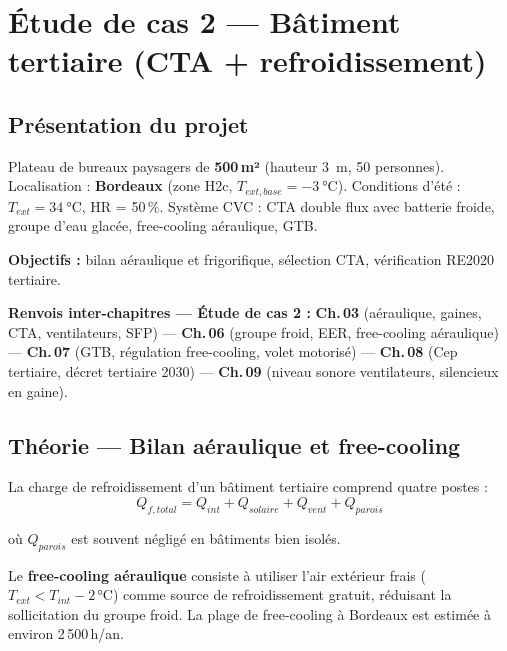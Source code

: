 \section{Étude de cas 2 — Bâtiment tertiaire (CTA + refroidissement)}

\subsection{Présentation du projet}

Plateau de bureaux paysagers de \textbf{500\,m²} (hauteur \SI{3}{\metre}, 50 personnes).
Localisation : \textbf{Bordeaux} (zone H2c, $T_{ext,base} = \SI{-3}{\celsius}$).
Conditions d'été : $T_{ext} = \SI{34}{\celsius}$, HR = 50\,\%.
Système CVC : CTA double flux avec batterie froide, groupe d'eau glacée,
free-cooling aéraulique, GTB.

\textbf{Objectifs :} bilan aéraulique et frigorifique, sélection CTA, vérification RE2020 tertiaire.

\begin{tcolorbox}[colback=FedBlue!4, colframe=FedBlue!35, boxrule=0.5pt, arc=1pt,
  top=3pt, bottom=3pt, left=6pt, right=6pt]
\footnotesize\sffamily
\textbf{Renvois inter-chapitres — Étude de cas 2 :}\quad
\textbf{Ch.\,03} (aéraulique, gaines, CTA, ventilateurs, SFP) — \textbf{Ch.\,06} (groupe froid, EER, free-cooling aéraulique) —
\textbf{Ch.\,07} (GTB, régulation free-cooling, volet motorisé) — \textbf{Ch.\,08} (Cep tertiaire, décret tertiaire 2030) —
\textbf{Ch.\,09} (niveau sonore ventilateurs, silencieux en gaine).
\end{tcolorbox}

\subsection{Théorie — Bilan aéraulique et free-cooling}

La charge de refroidissement d'un bâtiment tertiaire comprend quatre postes :
\begin{equation}
  Q_{f,total} = Q_{int} + Q_{solaire} + Q_{vent} + Q_{parois}
\end{equation}

où $Q_{parois}$ est souvent négligé en bâtiments bien isolés.

Le \textbf{free-cooling aéraulique} consiste à utiliser l'air extérieur frais ($T_{ext} < T_{int} - 2\,\si{\celsius}$)
comme source de refroidissement gratuit, réduisant la sollicitation du groupe froid.
La plage de free-cooling à Bordeaux est estimée à environ 2\,500\,h/an.

